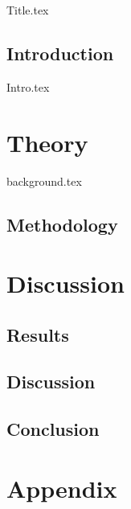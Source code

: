 \documentclass[a4paper,
               11pt,
               ]{report}
\begin{document}
\def\spath#1{{#1.tex}}
\spath{Title} %

\tableofcontents







\newpage
{}
\chapter*{Introduction} 
\spath{Intro}

\part{Theory}

\spath{background}


\newpage
\chapter{Methodology}


\newpage
\part{Discussion}
\chapter{Results}


\newpage
\chapter{Discussion}

\newpage
\chapter{Conclusion}

\newpage
\printbibliography[title={Bliblyogrpah}]
\newpage

\part{Appendix}
\end{document}
